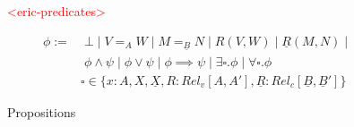 \documentclass[acmsmall]{acmart}
\newcommand{\eric}[1]{\textcolor{red}{ <eric-#1> }}
\begin{document}
\begin{figure}[h]
  \centering
  \eric{predicates}

  \begin{align*}
    \phi :=&\; \bot\;|\;V=_{A}W \;|\; M=_{\underline{B}}N \;|\; R(V,W) \;|\; \underline{R}(M,N) \;|\; 
    \\
    &\; \phi \land \psi \;|\; \phi \lor \psi \;|\; \phi \implies \psi \;|\; \exists \square.\phi \;|\; \forall \square .\phi \\ 
    & \square \in \{x:A,X,\underline{X},R:Rel_v[A,A'],\underline{R}:Rel_c[\underline{B},\underline{B}']\}
    \end{align*}
  \caption{Propositions}
  \label{fig:Props}
\end{figure}
\end{document}
